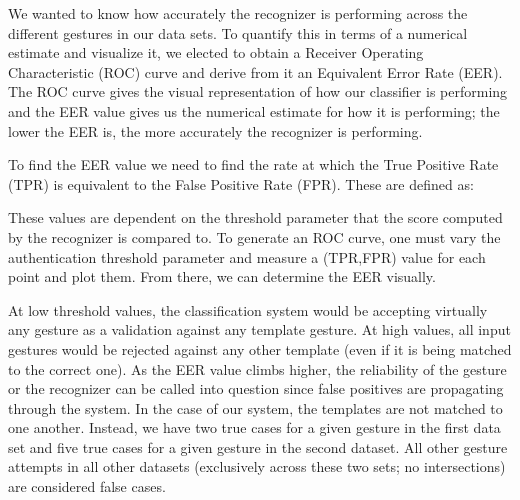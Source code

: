 \documentclass{sig-alternate-10pt}
\begin{document}
We wanted to know how accurately the recognizer is performing across the different gestures in our data sets. To quantify this in terms of a numerical estimate and visualize it, we elected to obtain a Receiver Operating Characteristic (ROC) curve and derive from it an Equivalent Error Rate (EER). The ROC curve gives the visual representation of how our classifier is performing and the EER value gives us the numerical estimate for how it is performing; the lower the EER is, the more accurately the recognizer is performing.


To find the EER value we need to find the rate at which the True Positive Rate (TPR) is equivalent to the False Positive Rate (FPR). These are defined as:






These values are dependent on the threshold parameter that the score computed by the recognizer is compared to. To generate an ROC curve, one must vary the authentication threshold parameter and measure a (TPR,FPR) value for each point and plot them. From there, we can determine the EER visually. 

At low threshold values, the classification system would be accepting virtually any gesture as a validation against any template gesture. At high values, all input gestures would be rejected against any other template (even if it is being matched to the correct one). As the EER value climbs higher, the reliability of the gesture or the recognizer can be called into question since false positives are propagating through the system.  In the case of our system, the templates are not matched to one another. Instead, we have two true cases for a given gesture in the first data set and five true cases for a given gesture in the second dataset. All other gesture attempts in all other datasets (exclusively across these two sets; no intersections) are considered false cases. 
\end{document}
